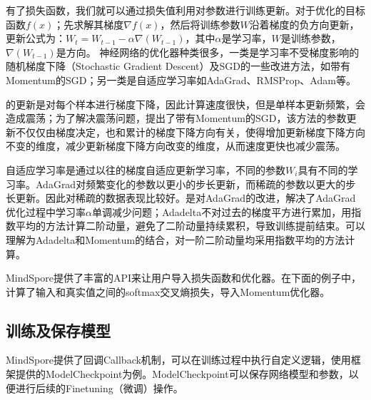 \documentclass[letterpaper,10pt,english]{sphinxmanual}
\begin{document}
\sphinxAtStartPar
有了损失函数，我们就可以通过损失值利用对参数进行训练更新。对于优化的目标函数\(f(x)\)；先求解其梯度\(\nabla\)\(f(x)\)，然后将训练参数\(W\)沿着梯度的负方向更新，更新公式为：\(W_t = W_{t-1} - \alpha\nabla(W_{t-1})\)，其中\(\alpha\)是学习率，\(W\)是训练参数，\(\nabla(W_{t-1})\)是方向。
神经网络的优化器种类很多，一类是学习率不受梯度影响的随机梯度下降（Stochastic
Gradient
Descent）及SGD的一些改进方法，如带有Momentum的SGD；另一类是自适应学习率如AdaGrad、RMSProp、Adam等。

\sphinxAtStartPar
{}的更新是对每个样本进行梯度下降，因此计算速度很快，但是单样本更新频繁，会造成震荡；为了解决震荡问题，提出了带有Momentum的SGD，该方法的参数更新不仅仅由梯度决定，也和累计的梯度下降方向有关，使得增加更新梯度下降方向不变的维度，减少更新梯度下降方向改变的维度，从而速度更快也减少震荡。

\sphinxAtStartPar
自适应学习率是通过以往的梯度自适应更新学习率，不同的参数\(W_i\)具有不同的学习率。AdaGrad对频繁变化的参数以更小的步长更新，而稀疏的参数以更大的步长更新。因此对稀疏的数据表现比较好。是对AdaGrad的改进，解决了AdaGrad优化过程中学习率\(\alpha\)单调减少问题；Adadelta不对过去的梯度平方进行累加，用指数平均的方法计算二阶动量，避免了二阶动量持续累积，导致训练提前结束。可以理解为Adadelta和Momentum的结合，对一阶二阶动量均采用指数平均的方法计算。

\sphinxAtStartPar
MindSpore提供了丰富的API来让用户导入损失函数和优化器。在下面的例子中，计算了输入和真实值之间的softmax交叉熵损失，导入Momentum优化器。

\begin{sphinxVerbatim}[commandchars=\\\{\}]
   
    
\end{sphinxVerbatim}


\subsection{训练及保存模型}
\label{\detokenize{chapter_programming_interface/ml_workflow:id6}}
\sphinxAtStartPar
MindSpore提供了回调Callback机制，可以在训练过程中执行自定义逻辑，使用框架提供的ModelCheckpoint为例。ModelCheckpoint可以保存网络模型和参数，以便进行后续的Fine\sphinxhyphen{}tuning（微调）操作。
\end{document}
